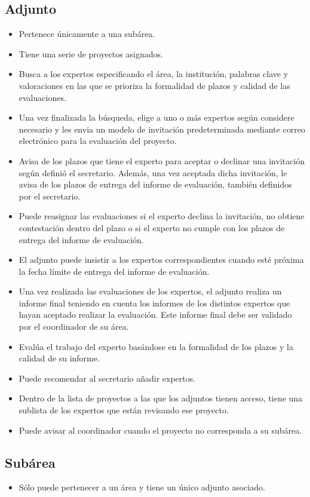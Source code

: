 \documentclass[12pt,a4paper,titlepage,spanish,twoside]{book}
\begin{document}
\subsection{Adjunto}
\begin{itemize}
\item Pertenece únicamente a una subárea.
\item Tiene una serie de proyectos asignados.
\item Busca a los expertos especificando el área, la institución, palabras
  clave y valoraciones en las que se prioriza la formalidad de plazos y
  calidad de las evaluaciones. 
\item Una vez finalizada la búsqueda, elige a uno o más expertos según
  considere necesario y les envia un modelo de invitación predeterminada
  mediante correo electrónico para la  evaluación del proyecto.  
\item Avisa de los plazos que tiene el experto para aceptar o declinar una
  invitación según definió el secretario. Además, una vez aceptada dicha
  invitación, le avisa de los plazos de entrega del informe de evaluación,
  también definidos por el secretario. 
\item Puede reasignar las evaluaciones si el experto declina la invitación,
  no obtiene contestación dentro del plazo o si el experto no cumple con los
  plazos de entrega del informe de evaluación.
\item El adjunto puede insistir a los expertos correspondientes cuando esté
  próxima la fecha límite de entrega del informe de evaluación.
\item Una vez realizada las evaluaciones de los expertos, el adjunto
  realiza un informe final teniendo en cuenta los informes de los distintos
  expertos que hayan aceptado realizar la evaluación. Este informe final
  debe ser validado por el coordinador de su área. 
\item Evalúa el trabajo del experto basándose en la formalidad de los plazos
  y la calidad de su informe. 
\item Puede recomendar al secretario añadir expertos.
\item Dentro de la lista de proyectos a las que los adjuntos tienen acceso,
  tiene una sublista de los expertos que están revisando ese proyecto. 
\item Puede avisar al coordinador cuando el proyecto no corresponda a su
  subárea. 
\end{itemize}

\subsection{Subárea}
\begin{itemize}
\item Sólo puede pertenecer a un área y tiene un único adjunto asociado.
\end{itemize}
\end{document}
